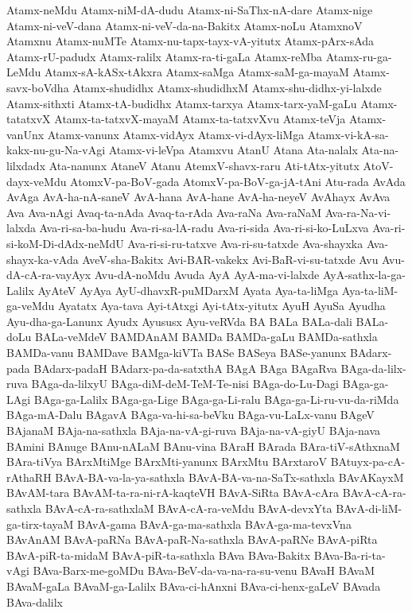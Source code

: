 {Atamx-neMdu
Atamx-niM-dA-dudu
Atamx-ni-SaThx-nA-dare
Atamx-nige
Atamx-ni-veV-dana
Atamx-ni-veV-da-na-Bakitx
Atamx-noLu
AtamxnoV
Atamxnu
Atamx-nuMTe
Atamx-nu-tapx-tayx-vA-yitutx
Atamx-pArx-sAda
Atamx-rU-padudx
Atamx-ralilx
Atamx-ra-ti-gaLa
Atamx-reMba
Atamx-ru-ga-LeMdu
Atamx-sA-kASx-tAkxra
Atamx-saMga
Atamx-saM-ga-mayaM
Atamx-savx-boVdha
Atamx-shudidhx
Atamx-shudidhxM
Atamx-shu-didhx-yi-lalxde
Atamx-sithxti
Atamx-tA-budidhx
Atamx-tarxya
Atamx-tarx-yaM-gaLu
Atamx-tatatxvX
Atamx-ta-tatxvX-mayaM
Atamx-ta-tatxvXvu
Atamx-teVja
Atamx-vanUnx
Atamx-vanunx
Atamx-vidAyx
Atamx-vi-dAyx-liMga
Atamx-vi-kA-sa-kakx-nu-gu-Na-vAgi
Atamx-vi-leVpa
Atamxvu
AtanU
Atana
Ata-nalalx
Ata-na-lilxdadx
Ata-nanunx
AtaneV
Atanu
AtemxV-shavx-raru
Ati-tAtx-yitutx
AtoV-dayx-veMdu
AtomxV-pa-BoV-gada
AtomxV-pa-BoV-ga-jA-tAni
Atu-rada
AvAda
AvAga
AvA-ha-nA-saneV
AvA-hana
AvA-hane
AvA-ha-neyeV
AvAhayx
AvAva
Ava
Ava-nAgi
Avaq-ta-nAda
Avaq-ta-rAda
Ava-raNa
Ava-raNaM
Ava-ra-Na-vi-lalxda
Ava-ri-sa-ba-hudu
Ava-ri-sa-lA-radu
Ava-ri-sida
Ava-ri-si-ko-LuLxva
Ava-ri-si-koM-Di-dAdx-neMdU
Ava-ri-si-ru-tatxve
Ava-ri-su-tatxde
Ava-shayxka
Ava-shayx-ka-vAda
AveV-sha-Bakitx
Avi-BAR-vakekx
Avi-BaR-vi-su-tatxde
Avu
Avu-dA-cA-ra-vayAyx
Avu-dA-noMdu
Avuda
AyA
AyA-ma-vi-lalxde
AyA-sathx-la-ga-Lalilx
AyAteV
AyAya
AyU-dhavxR-puMDarxM
Ayata
Aya-ta-liMga
Aya-ta-liM-ga-veMdu
Ayatatx
Aya-tava
Ayi-tAtxgi
Ayi-tAtx-yitutx
AyuH
AyuSa
Ayudha
Ayu-dha-ga-Lanunx
Ayudx
Ayususx
Ayu-veRVda
BA
BALa
BALa-dali
BALa-doLu
BALa-veMdeV
BAMDAnAM
BAMDa
BAMDa-gaLu
BAMDa-sathxla
BAMDa-vanu
BAMDave
BAMga-kiVTa
BASe
BASeya
BASe-yanunx
BAdarx-pada
BAdarx-padaH
BAdarx-pa-da-satxthA
BAgA
BAga
BAgaRva
BAga-da-lilx-ruva
BAga-da-lilxyU
BAga-diM-deM-TeM-Te-nisi
BAga-do-Lu-Dagi
BAga-ga-LAgi
BAga-ga-Lalilx
BAga-ga-Lige
BAga-ga-Li-ralu
BAga-ga-Li-ru-vu-da-riMda
BAga-mA-Dalu
BAgavA
BAga-va-hi-sa-beVku
BAga-vu-LaLx-vanu
BAgeV
BAjanaM
BAja-na-sathxla
BAja-na-vA-gi-ruva
BAja-na-vA-giyU
BAja-nava
BAmini
BAnuge
BAnu-nALaM
BAnu-vina
BAraH
BArada
BAra-tiV-sAthxnaM
BAra-tiVya
BArxMtiMge
BArxMti-yanunx
BArxMtu
BArxtaroV
BAtuyx-pa-cA-rAthaRH
BAvA-BA-va-la-ya-sathxla
BAvA-BA-va-na-SaTx-sathxla
BAvAKayxM
BAvAM-tara
BAvAM-ta-ra-ni-rA-kaqteVH
BAvA-SiRta
BAvA-cAra
BAvA-cA-ra-sathxla
BAvA-cA-ra-sathxlaM
BAvA-cA-ra-veMdu
BAvA-devxYta
BAvA-di-liM-ga-tirx-tayaM
BAvA-gama
BAvA-ga-ma-sathxla
BAvA-ga-ma-tevxVna
BAvAnAM
BAvA-paRNa
BAvA-paR-Na-sathxla
BAvA-paRNe
BAvA-piRta
BAvA-piR-ta-midaM
BAvA-piR-ta-sathxla
BAva
BAva-Bakitx
BAva-Ba-ri-ta-vAgi
BAva-Barx-me-goMDu
BAva-BeV-da-va-na-ra-su-venu
BAvaH
BAvaM
BAvaM-gaLa
BAvaM-ga-Lalilx
BAva-ci-hAnxni
BAva-ci-henx-gaLeV
BAvada
BAva-dalilx
}
